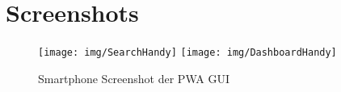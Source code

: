 \chapter{Screenshots}
\label{chap:screenshots}

\begin{figure}
    \label{figure:test}
    \centering
    \texttt{[image: img/SearchHandy]}\hspace{1em}
    \texttt{[image: img/DashboardHandy]}
    \caption{Smartphone Screenshot der PWA GUI}
\end{figure}
